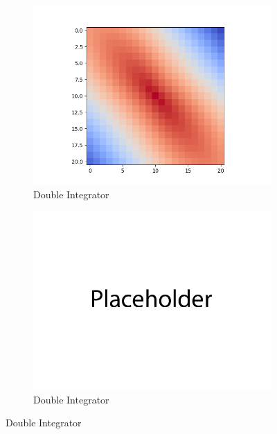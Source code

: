\documentclass{article}
\begin{document}
\begin{enumerate}[(a)]
\begin{figure}[h!]
    \centering
    \begin{subfigure}{0.45\textwidth}
        \centering
        \includegraphics[width=\textwidth]{figures/part_3_a_a.png}
        \caption{Double Integrator}
    \end{subfigure}
    \hspace{0.2 in}
    \begin{subfigure}{0.45\textwidth}
        \centering
        \includegraphics[width=\textwidth]{figures/placeholder.png}
        \caption{Double Integrator}
    \end{subfigure}
\end{figure}


\end{enumerate}
\end{document}
